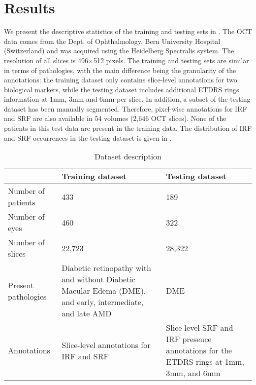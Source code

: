 \section{Results}
\label{sec:oct_results}
We present the descriptive statistics of the training and testing sets in . The OCT data comes from the Dept. of Ophthalmology, Bern University Hospital (Switzerland) and was acquired using the Heidelberg Spectralis system. The resolution of all slices is 496×512 pixels. The training and testing sets are similar in terms of pathologies, with the main difference being  the granularity of the annotations: the training dataset only contains slice-level annotations for two biological markers, while the testing dataset includes additional ETDRS rings information at 1mm, 3mm and 6mm per slice. In addition, a subset of the testing dataset has been manually segmented. Therefore, pixel-wise annotations for IRF and SRF are also available in 54 volumes (2,646 OCT slices). None of the patients in this test data are present in the training data. The distribution of IRF and SRF occurrences in the testing dataset is given in .

\noindent
\begin{table*}[t]
\centering
\caption{Dataset description}
\label{tab:dataset}
\begin{tabular}{p{4cm}p{5.5cm}p{5.5cm}}
\toprule
 & Training dataset & Testing dataset \\ \midrule
Number of patients & 433 & 189 \\
Number of eyes & 460 & 322 \\
Number of slices & 22,723 & 28,322 \\
Present pathologies & Diabetic retinopathy with and without Diabetic Macular Edema (DME), and early, intermediate, and late AMD & DME \\
Annotations & Slice-level annotations for IRF and SRF & Slice-level SRF and IRF presence   annotations for the ETDRS rings at 1mm, 3mm, and 6mm \\ \bottomrule
\end{tabular}
\end{table*}

